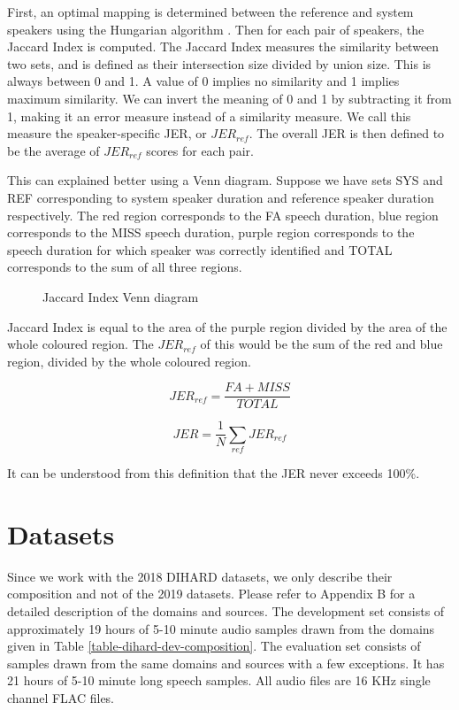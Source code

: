 	First, an optimal mapping is determined between the reference and system speakers using the Hungarian algorithm \cite{hungarian}. Then for each pair of speakers, the Jaccard Index \cite{hamers1989similarity} is computed. The Jaccard Index measures the similarity between two sets, and is defined as their intersection size divided by union size. This is always between 0 and 1. A value of 0 implies no similarity and 1 implies maximum similarity. We can invert the meaning of 0 and 1 by subtracting it from 1, making it an error measure instead of a similarity measure. We call this measure the speaker-specific JER, or $JER_{ref}$. The overall JER is then defined to be the average of $JER_{ref}$ scores for each pair.
	
	This can explained better using a Venn diagram. Suppose we have sets SYS and REF corresponding to system speaker duration and reference speaker duration respectively. The red region corresponds to the FA speech duration, blue region corresponds to the MISS speech duration, purple region corresponds to the speech duration for which speaker was correctly identified and TOTAL corresponds to the sum of all three regions.
	
	\begin{figure}[h]
		\centering
		\def\syscircle{(0,0) circle (1.5cm)}
		\def\refcircle{(0:2cm) circle (1.5cm)}
		\caption{Jaccard Index Venn diagram}
	\end{figure}
	
	Jaccard Index is equal to the area of the purple region divided by the area of the whole coloured region. The $JER_{ref}$ of this would be the sum of the red and blue region, divided by the whole coloured region.
	
	$$ JER_{ref} = \frac{FA + MISS}{TOTAL} $$
	
	$$ JER = \frac{1}{N}\sum_{ref}JER_{ref} $$
	
	It can be understood from this definition that the JER never exceeds 100\%.
	
\section{Datasets}
Since we work with the 2018 DIHARD datasets, we only describe their composition and not of the 2019 datasets. Please refer to Appendix B for a detailed description of the domains and sources. The development set consists of approximately 19 hours of 5-10 minute audio samples drawn from the domains given in Table \ref{table-dihard-dev-composition}. The evaluation set consists of samples drawn from the same domains and sources with a few exceptions. It has 21 hours of 5-10 minute long speech samples. All audio files are 16 KHz single channel FLAC files.

